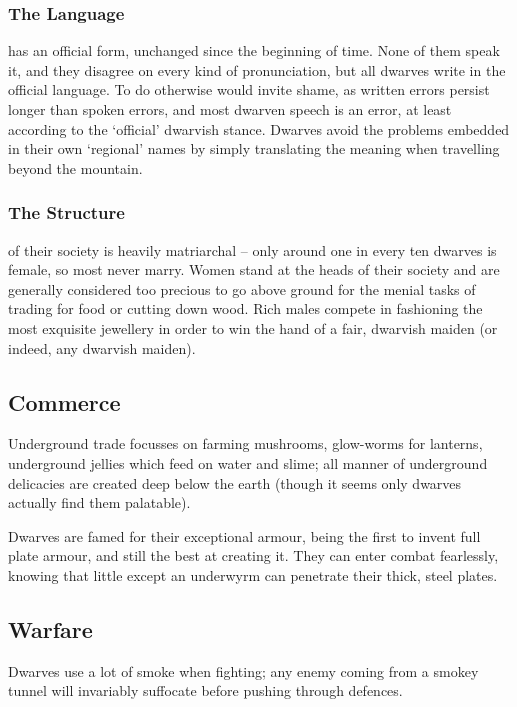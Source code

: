 \subsubsection{The Language}
has an official form, unchanged since the beginning of time.
None of them speak it, and they disagree on every kind of pronunciation, but all dwarves write in the official language.
To do otherwise would invite shame, as written errors persist longer than spoken errors, and most dwarven speech is an error, at least according to the `official' dwarvish stance.
Dwarves avoid the problems embedded in their own `regional' names by simply translating the meaning when travelling beyond the mountain.

\subsubsection{The Structure}
\label{dwarven_structure}
of their society is heavily matriarchal -- only around one in every ten dwarves is female, so most never marry.
Women stand at the heads of their society and are generally considered too precious to go above ground for the menial tasks of trading for food or cutting down wood.
Rich males compete in fashioning the most exquisite jewellery in order to win the hand of a fair, dwarvish maiden (or indeed, any dwarvish maiden).

\subsection{Commerce}

Underground trade focusses on farming mushrooms, glow-worms for lanterns, underground jellies which feed on water and slime; all manner of underground delicacies are created deep below the earth (though it seems only dwarves actually find them palatable).

Dwarves are famed for their exceptional armour, being the first to invent full plate armour, and still the best at creating it.
They can enter combat fearlessly, knowing that little except an underwyrm can penetrate their thick, steel plates.

\subsection{Warfare}

Dwarves use a lot of smoke when fighting; any enemy coming from a smokey tunnel will invariably suffocate before pushing through defences.

